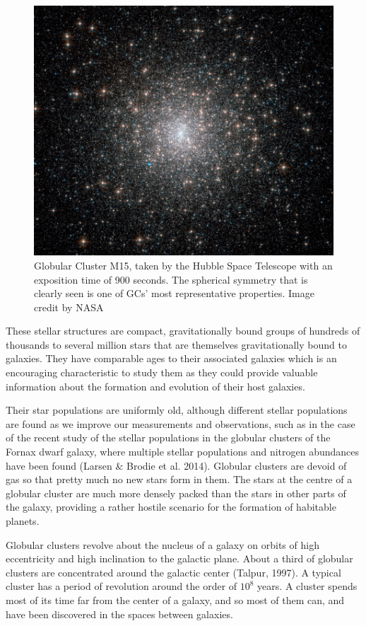 \begin{figure}[H]
\centering
\includegraphics[width=12cm]{images/m15.jpg}
\caption[M15 Globular cluster]{Globular Cluster M15, taken by the Hubble Space Telescope with an exposition time of 900 seconds. The spherical symmetry  that is clearly seen is one of GCs' most representative properties. Image credit by NASA}
\end{figure}

These stellar structures are compact, gravitationally bound groups of hundreds of thousands to several million stars that are themselves gravitationally bound to galaxies. They have comparable ages to their associated galaxies which is an encouraging characteristic to study them as they could provide valuable information about the formation and evolution of their host galaxies.

Their star populations are uniformly old, although different stellar populations are found as we improve our measurements and observations, such as in the case of the recent study of the stellar populations in the globular clusters of the Fornax dwarf galaxy, where multiple stellar populations and nitrogen abundances have been found (Larsen \& Brodie et al. 2014). Globular clusters are devoid of gas so that pretty much no new stars form in them. The stars at the centre of a globular cluster are much more densely packed than the stars in other parts of the galaxy, providing a rather hostile scenario for the formation of habitable planets.

Globular clusters revolve about the nucleus of a galaxy on orbits of high eccentricity and high inclination to the galactic plane. About a third of globular clusters are concentrated around the galactic center (Talpur, 1997). A typical cluster has a period of revolution around the order of $ 10^{8} $ years. A cluster spends most of its time far from the center of a galaxy, and so most of them can, and have been discovered in the spaces between galaxies. 

